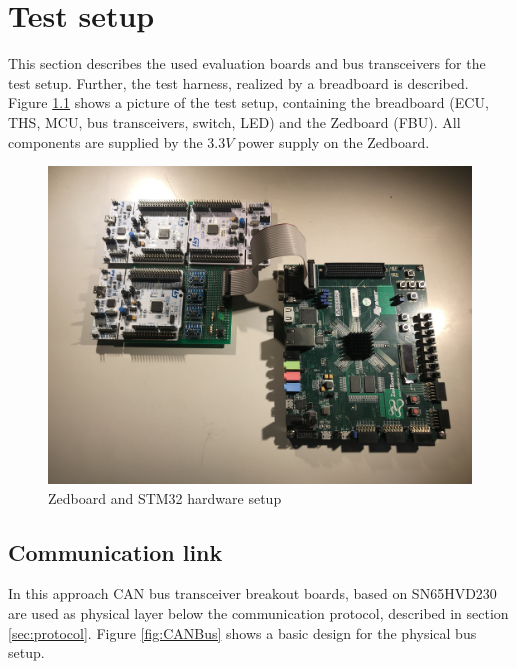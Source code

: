 \chapter{Test setup}

This section describes the used evaluation boards and bus transceivers for the test setup. Further, the test harness, realized by a breadboard is described. 
Figure \ref{fig:setup} shows a picture of the test setup, containing the breadboard (\gls{ECU}, \gls{THS}, \gls{MCU}, bus transceivers, switch, LED) and the Zedboard (\gls{FBU}). All components are supplied by the $3.3V$ power supply on the Zedboard.

\begin{figure}[h!]
    \centering
    \includegraphics[width=\textwidth]{figures/hw_setup.jpg}
    \caption{Zedboard and STM32 hardware setup}\label{fig:setup}
\end{figure}

\section{Communication link}

In this approach CAN bus transceiver breakout boards, based on SN65HVD230 \cite{CANTransceiver} are used as physical layer below the communication protocol, described in section \ref{sec:protocol}. Figure \ref{fig:CANBus} shows a basic design for the physical bus setup.

